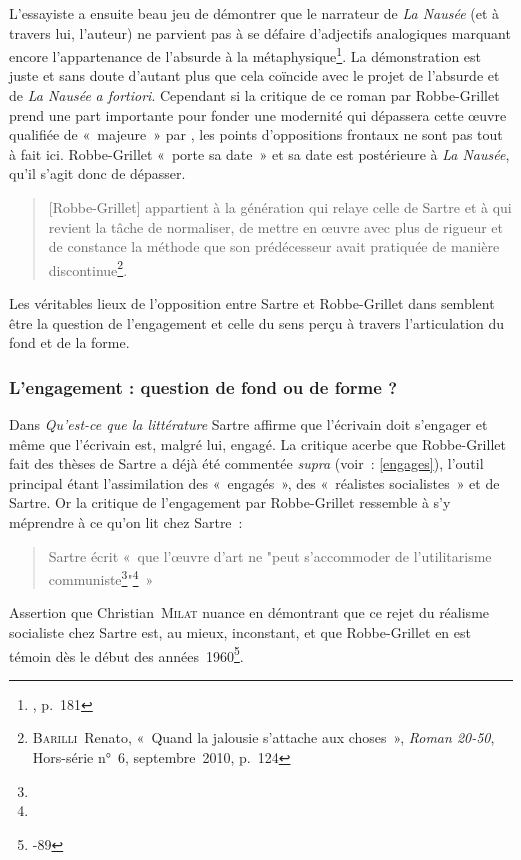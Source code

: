 \documentclass[12pt, a4paper]{article}
\begin{document}
L'essayiste a ensuite beau jeu de démontrer que le narrateur de \textit{La Nausée} (et à travers lui, l'auteur) ne parvient pas à se défaire d'adjectifs analogiques marquant encore l'appartenance de l'absurde à la métaphysique\footnote{, p.~181}. La démonstration est juste et sans doute d'autant plus que cela coïncide avec le projet de l'absurde et de \textit{La Nausée} \textit{a fortiori}. Cependant si la critique de ce roman par Robbe-Grillet prend une part importante pour fonder une modernité qui dépassera cette œuvre qualifiée de «~majeure~» par \robbe, les points d'oppositions frontaux ne sont pas tout à fait ici. Robbe-Grillet «~porte sa date~» et sa date est postérieure à \textit{La Nausée}, qu'il s'agit donc de dépasser.
\begin{quote}
     [Robbe-Grillet] appartient à la génération qui relaye celle de Sartre et à qui revient la tâche de normaliser, de mettre en œuvre avec plus de rigueur et de constance la méthode que son prédécesseur avait pratiquée de manière discontinue\footnote{\textsc{Barilli}~Renato, «~Quand la jalousie s'attache aux choses~», \textit{Roman 20-50}, Hors-série n°~6, septembre~2010, p.~124}.
\end{quote}


Les véritables lieux de l'opposition entre Sartre et Robbe-Grillet dans \punr{} semblent être la question de l'engagement et celle du sens perçu à travers l'articulation du fond et de la forme.


\subsubsection{L'engagement : question de fond ou de forme ?}


Dans \textit{Qu'est-ce que la littérature} Sartre affirme que l'écrivain doit s'engager et même que l'écrivain est, malgré lui, engagé. La critique acerbe que Robbe-Grillet fait des thèses de Sartre a déjà été commentée \textit{supra} (voir~: \ref{engages}), l'outil principal étant l'assimilation des «~engagés~», des «~réalistes socialistes~» et de Sartre. Or la critique de l'engagement par Robbe-Grillet ressemble à s'y méprendre à ce qu'on lit chez Sartre~:
\begin{quote}
    Sartre écrit «~que l'œuvre d'art ne "peut s'accommoder de l'utilitarisme communiste\footnote{}"\footnote{}~»
\end{quote}
Assertion que Christian~\textsc{Milat} nuance en démontrant que ce rejet du réalisme socialiste chez Sartre est, au mieux, inconstant, et que Robbe-Grillet en est témoin dès le début des années~1960\footnote{-89}.
\end{document}
